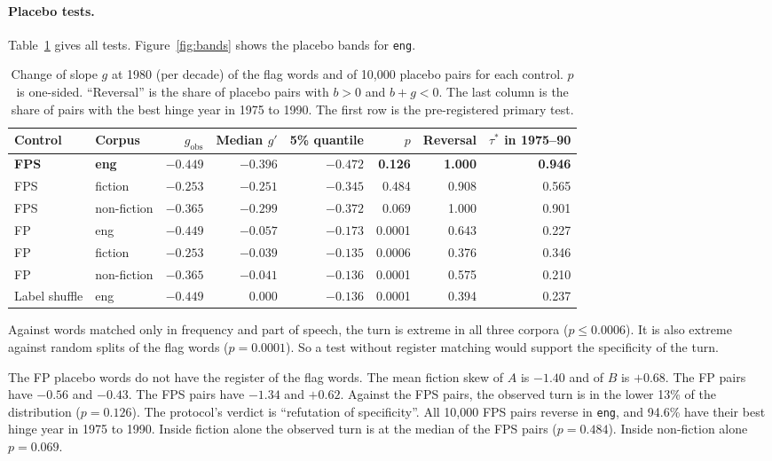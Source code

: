 \documentclass[11pt]{article}
\begin{document}
\paragraph{Placebo tests.} Table~\ref{tab:main} gives all tests. Figure~\ref{fig:bands} shows the placebo bands for \texttt{eng}.

\begin{table}[h]
\centering
\small
\begin{tabular}{llrrrrrr}
\toprule
Control & Corpus & $g_{\mathrm{obs}}$ & Median $g'$ & 5\% quantile & $p$ & Reversal & $\tau^*$ in 1975--90\\
\midrule
\textbf{FPS} & \textbf{eng} & $\mathbf{-0.449}$ & $\mathbf{-0.396}$ & $\mathbf{-0.472}$ & \textbf{0.126} & \textbf{1.000} & \textbf{0.946}\\
FPS & fiction & $-0.253$ & $-0.251$ & $-0.345$ & 0.484 & 0.908 & 0.565\\
FPS & non-fiction & $-0.365$ & $-0.299$ & $-0.372$ & 0.069 & 1.000 & 0.901\\
FP & eng & $-0.449$ & $-0.057$ & $-0.173$ & 0.0001 & 0.643 & 0.227\\
FP & fiction & $-0.253$ & $-0.039$ & $-0.135$ & 0.0006 & 0.376 & 0.346\\
FP & non-fiction & $-0.365$ & $-0.041$ & $-0.136$ & 0.0001 & 0.575 & 0.210\\
Label shuffle & eng & $-0.449$ & $0.000$ & $-0.136$ & 0.0001 & 0.394 & 0.237\\
\bottomrule
\end{tabular}
\caption{Change of slope $g$ at 1980 (per decade) of the flag words and of 10,000 placebo pairs for each control. $p$ is one-sided. ``Reversal'' is the share of placebo pairs with $b>0$ and $b+g<0$. The last column is the share of pairs with the best hinge year in 1975 to 1990. The first row is the pre-registered primary test.}
\label{tab:main}
\end{table}

Against words matched only in frequency and part of speech, the turn is extreme in all three corpora ($p \le 0.0006$). It is also extreme against random splits of the flag words ($p = 0.0001$). So a test without register matching would support the specificity of the turn.

The FP placebo words do not have the register of the flag words. The mean fiction skew of $A$ is $-1.40$ and of $B$ is $+0.68$. The FP pairs have $-0.56$ and $-0.43$. The FPS pairs have $-1.34$ and $+0.62$. Against the FPS pairs, the observed turn is in the lower 13\% of the distribution ($p = 0.126$). The protocol's verdict is ``refutation of specificity''. All 10,000 FPS pairs reverse in \texttt{eng}, and 94.6\% have their best hinge year in 1975 to 1990. Inside fiction alone the observed turn is at the median of the FPS pairs ($p = 0.484$). Inside non-fiction alone $p = 0.069$.
\end{document}

